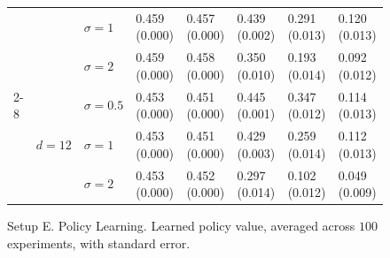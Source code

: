 \documentclass[11pt]{article} %
\theoremstyle{theorem}  %
\theoremstyle{plain}
\begin{document}
\begin{figure}[H]
\begin{tabular}{llllllll}
         &        & $\sigma=1$ &  0.459 (0.000) &  0.457 (0.000) &  0.439 (0.002) &  0.291 (0.013) &  0.120 (0.013) \\
         &        & $\sigma=2$ &  0.459 (0.000) &  0.458 (0.000) &  0.350 (0.010) &  0.193 (0.014) &  0.092 (0.012) \\
\cline{2-8}
         & \multirow{3}{*}{$d=12$} & $\sigma=0.5$ &  0.453 (0.000) &  0.451 (0.000) &  0.445 (0.001) &  0.347 (0.012) &  0.114 (0.013) \\
         &        & $\sigma=1$ &  0.453 (0.000) &  0.451 (0.000) &  0.429 (0.003) &  0.259 (0.014) &  0.112 (0.013) \\
         &        & $\sigma=2$ &  0.453 (0.000) &  0.452 (0.000) &  0.297 (0.014) &  0.102 (0.012) &  0.049 (0.009) \\
\bottomrule
\end{tabular}

\caption{Setup E. Policy Learning. Learned policy value, averaged across $100$ experiments, with standard error.}
\label{fig:setupE-policy}
\end{figure}
 
\end{document}
